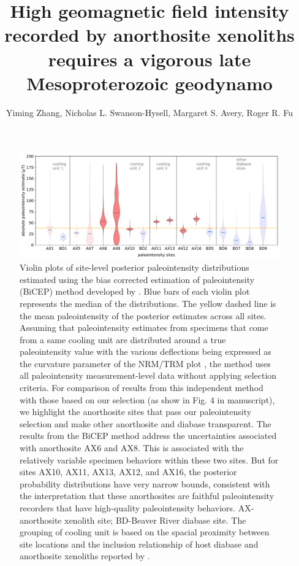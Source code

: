 \documentclass[9pt,twoside,lineno]{pnas-new}
\title{High geomagnetic field intensity recorded by anorthosite xenoliths requires a vigorous late Mesoproterozoic geodynamo}
\author{Yiming Zhang, Nicholas L. Swanson-Hysell, Margaret S. Avery, Roger R. Fu}
\begin{document}
\maketitle



\begin{figure}[h!]
\noindent\includegraphics[width=17.8 cm]{PINT_BiCEP.pdf}
\centering
\caption{{Violin plots of site-level posterior paleointensity distributions estimated using the bias corrected estimation of paleointensity (BiCEP) method developed by \citealp{Cych2021a}. Blue bars of each violin plot represents the median of the distributions. The yellow dashed line is the mean paleointensity of the posterior estimates across all sites. Assuming that paleointensity estimates from specimens that come from a same cooling unit are distributed around a true paleointensity value with the various deflections being expressed as the curvature parameter of the NRM/TRM plot \cite{Arai1963a, Paterson2011a}, the method uses all paleointensity measurement-level data without applying selection criteria. For comparison of results from this independent method with those based on our selection (as show in Fig. 4 in manuscript), we highlight the anorthosite sites that pass our paleointensity selection and make other anorthosite and diabase transparent. The results from the BiCEP method address the uncertainties associated with anorthosite AX6 and AX8. This is associated with the relatively variable specimen behaviors within these two sites. But for sites AX10, AX11, AX13, AX12, and AX16, the posterior probability distributions have very narrow bounds, consistent with the interpretation that these anorthosites are faithful paleointensity recorders that have high-quality paleointensity behaviors. AX-anorthosite xenolith site; BD-Beaver River diabase site. The grouping of cooling unit is based on the spacial proximity between site locations and the inclusion relationship of host diabase and anorthosite xenoliths reported by \citealp{Zhang2021b}.}}
\label{fig:PINT_BiCEP}
\end{figure}
\end{document}
